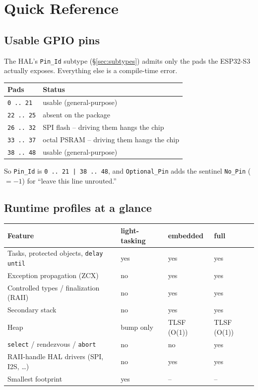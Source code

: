 \chapter{Quick Reference}
\label{ch:appendix}

\section{Usable GPIO pins}
\label{app:pins}

The HAL's \texttt{Pin\_Id} subtype (\S\ref{sec:subtypes}) admits only the pads the
ESP32-S3 actually exposes. Everything else is a compile-time error.

\begin{center}
\begin{tabular}{l l}
\toprule
\textbf{Pads} & \textbf{Status} \\ \midrule
\texttt{0 .. 21}   & usable (general-purpose) \\
\texttt{22 .. 25}  & absent on the package \\
\texttt{26 .. 32}  & SPI flash -- driving them hangs the chip \\
\texttt{33 .. 37}  & octal PSRAM -- driving them hangs the chip \\
\texttt{38 .. 48}  & usable (general-purpose) \\
\bottomrule
\end{tabular}
\end{center}

So \texttt{Pin\_Id} is \texttt{0\,..\,21 | 38\,..\,48}, and \texttt{Optional\_Pin}
adds the sentinel \texttt{No\_Pin} ($=-1$) for ``leave this line unrouted.''

\section{Runtime profiles at a glance}
\label{app:profiles}

\begin{center}
\begin{tabular}{l l l l}
\toprule
\textbf{Feature} & \textbf{light-tasking} & \textbf{embedded} & \textbf{full} \\ \midrule
Tasks, protected objects, \texttt{delay until} & yes & yes & yes \\
Exception propagation (ZCX)        & no  & yes & yes \\
Controlled types / finalization (RAII) & no & yes & yes \\
Secondary stack                    & no  & yes & yes \\
Heap                               & bump only & TLSF (O(1)) & TLSF (O(1)) \\
\texttt{select} / rendezvous / \texttt{abort} & no & no & yes \\
RAII-handle HAL drivers (SPI, I2S, \ldots) & no & yes & yes \\
Smallest footprint                 & yes & -- & -- \\
\bottomrule
\end{tabular}
\end{center}

